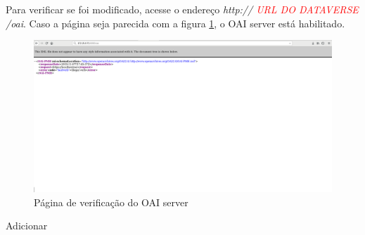\documentclass[12pt,hidelinks]{article}
\begin{document}
Para verificar se foi modificado, acesse o endereço \textit{http:// \textcolor{red}{URL DO DATAVERSE} /oai}. Caso a página seja parecida com a figura \ref{img06.png}, o OAI server está habilitado.

\begin{figure}[!htp]
    \centering
      \includegraphics[scale=0.2]{imagens/06.png}
        \caption{Página de verificação do OAI server}
    \label{img06.png}
 \end{figure}

Adicionar 
\end{document}

